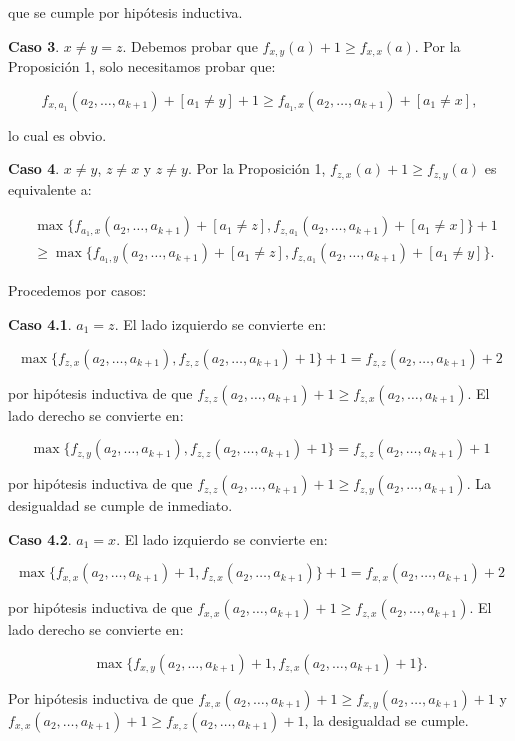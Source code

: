\documentclass{article}
\begin{document}
que se cumple por hipótesis inductiva.

\textbf{Caso 3}. $x \neq y = z$. Debemos probar que $f_{x,y}(a) + 1 \geq f_{x,x}(a)$. Por la Proposición 1, solo necesitamos probar que:

$$
f_{x,a_1}(a_2, \ldots, a_{k+1}) + [a_1 \neq y] + 1 \geq f_{a_1,x}(a_2, \ldots, a_{k+1}) + [a_1 \neq x],
$$


lo cual es obvio.

\textbf{Caso 4}. $x \neq y$, $z \neq x$ y $z \neq y$. Por la Proposición 1, $f_{z,x}(a) + 1 \geq f_{z,y}(a)$ es equivalente a:

\begin{align*}
&\max \{f_{a_1,x}(a_2, \ldots, a_{k+1}) + [a_1 \neq z], f_{z,a_1}(a_2, \ldots, a_{k+1}) + [a_1 \neq x]\} + 1 \\
&\geq \max \{f_{a_1,y}(a_2, \ldots, a_{k+1}) + [a_1 \neq z], f_{z,a_1}(a_2, \ldots, a_{k+1}) + [a_1 \neq y]\}.
\end{align*}

Procedemos por casos:

\textbf{Caso 4.1}. $a_1 = z$. El lado izquierdo se convierte en:

$$
\max \{f_{z,x}(a_2, \ldots, a_{k+1}), f_{z,z}(a_2, \ldots, a_{k+1}) + 1\} + 1 = f_{z,z}(a_2, \ldots, a_{k+1}) + 2
$$


por hipótesis inductiva de que $f_{z,z}(a_2, \ldots, a_{k+1}) + 1 \geq f_{z,x}(a_2, \ldots, a_{k+1})$. El lado derecho se convierte en:

$$
\max \{f_{z,y}(a_2, \ldots, a_{k+1}), f_{z,z}(a_2, \ldots, a_{k+1}) + 1\} = f_{z,z}(a_2, \ldots, a_{k+1}) + 1
$$


por hipótesis inductiva de que $f_{z,z}(a_2, \ldots, a_{k+1}) + 1 \geq f_{z,y}(a_2, \ldots, a_{k+1})$. La desigualdad se cumple de inmediato.

\textbf{Caso 4.2}. $a_1 = x$. El lado izquierdo se convierte en:

$$
\max \{f_{x,x}(a_2, \ldots, a_{k+1}) + 1, f_{z,x}(a_2, \ldots, a_{k+1})\} + 1 = f_{x,x}(a_2, \ldots, a_{k+1}) + 2
$$


por hipótesis inductiva de que $f_{x,x}(a_2, \ldots, a_{k+1}) + 1 \geq f_{z,x}(a_2, \ldots, a_{k+1})$. El lado derecho se convierte en:

$$
\max \{f_{x,y}(a_2, \ldots, a_{k+1}) + 1, f_{z,x}(a_2, \ldots, a_{k+1}) + 1\}.
$$


Por hipótesis inductiva de que $f_{x,x}(a_2, \ldots, a_{k+1}) + 1 \geq f_{x,y}(a_2, \ldots, a_{k+1}) + 1$ y $f_{x,x}(a_2, \ldots, a_{k+1}) + 1 \geq f_{x,z}(a_2, \ldots, a_{k+1}) + 1$, la desigualdad se cumple.
\end{document}
